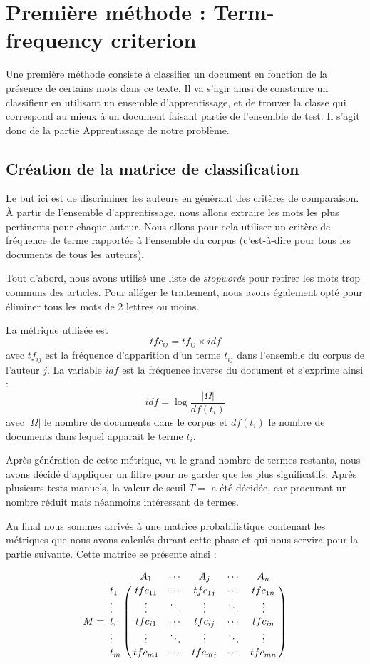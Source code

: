 \documentclass[a4paper,12pt]{report}
\begin{document}
\section{Première méthode : Term-frequency criterion}
Une première méthode consiste à classifier un document en fonction de la présence de certains mots dans ce texte. Il va s'agir ainsi de construire un classifieur en utilisant un ensemble d'apprentissage, et de trouver la classe qui correspond au mieux à un document faisant partie de l'ensemble de test. Il s'agit donc de la partie Apprentissage de notre problème.

\subsection{Création de la matrice de classification}
Le but ici est de discriminer les auteurs en générant des critères de comparaison. À partir de l'ensemble d'apprentissage, nous allons extraire les mots les plus pertinents pour chaque auteur. Nous allons pour cela utiliser un critère de fréquence de terme rapportée à l'ensemble du corpus (c'est-à-dire pour tous les documents de tous les auteurs).

Tout d'abord, nous avons utilisé une liste de \textit{stopwords} pour retirer les mots trop communs des articles. Pour alléger le traitement, nous avons également opté pour éliminer tous les mots de 2 lettres ou moins. 

La métrique utilisée est \[ tfc_{ij} = tf_{ij} \times idf\] avec $tf_{ij}$ est la fréquence d'apparition d'un terme $t_{ij}$ dans l'ensemble du corpus de l'auteur $j$. La variable $idf$ est la fréquence inverse du document et s'exprime ainsi : \[idf = \log \frac{|\Omega|}{df(t_{i})} \] avec $|\Omega|$ le nombre de documents dans le corpus et $df(t_{i})$ le nombre de documents dans lequel apparait le terme $t_{i}$.

Après génération de cette métrique, vu le grand nombre de termes restants, nous avons décidé d'appliquer un filtre pour ne garder que les plus significatifs. Après plusieurs tests manuels, la valeur de seuil $T = $  a été décidée, car procurant un nombre réduit mais néanmoins intéressant de termes.

Au final nous sommes arrivés à une matrice probabilistique contenant les métriques que nous avons calculés durant cette phase et qui nous servira pour la partie suivante. Cette matrice se présente ainsi :

\[M=\bordermatrix{
&A_{1}&\cdots&A_{j}&\cdots&A_{n}\cr
t_{1}& tfc_{11} & \cdots & tfc_{1j} & \cdots & tfc_{1n} \cr
\vdots&\vdots&\ddots&\vdots&\ddots&\vdots\cr
t_{i}& tfc_{i1} & \cdots & tfc_{ij} & \cdots & tfc_{in} \cr
\vdots&\vdots&\ddots&\vdots&\ddots&\vdots\cr
t_{m}& tfc_{m1} & \cdots & tfc_{mj} & \cdots & tfc_{mn} \cr
}\]
\end{document}
